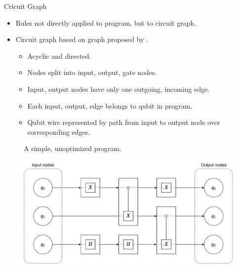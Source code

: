 \begin{frame}{Cricuit Graph}
    \begin{itemize}
        \item Rules not directly applied to program, but to circuit graph.
        \item Circuit graph based on graph proposed by \cite{KMO*23}.
        \begin{itemize}
            \item Acyclic and directed.
            \item Nodes split into input, output, gate nodes.
            \item Input, output nodes have only one outgoing, incoming edge. 
            \item Each input, output, edge belongs to qubit in program.
            \item Qubit wire represented by path from input to output node over corresponding edges.
        \end{itemize}
    \end{itemize}
    \vfill
    \begin{minipage}{.35\textwidth}
        \begin{figure}
            \centering
            
            \caption{A simple, unoptimized program.}
        \end{figure}
    \end{minipage}
    \begin{minipage}{.60\textwidth}
        \begin{figure}[htp]
            \centering     
            \includegraphics[width=.9\textwidth]{../figures/drawio/circuit_graph_unoptimized.pdf}

\end{figure}
\end{minipage}
\end{frame}
